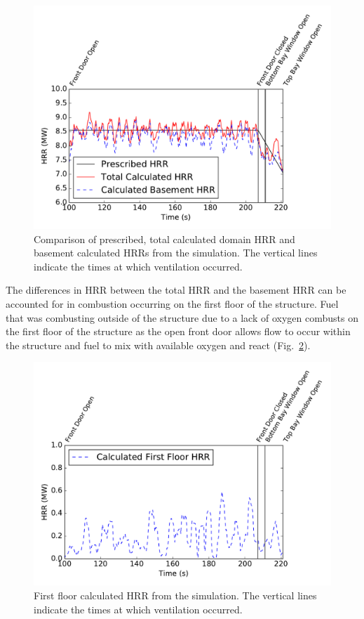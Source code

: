 \documentclass[12pt,oneside]{book}
\begin{document}
\begin{figure}[!ht]
\includegraphics[width=5in]{../Figures/PG_Basement_9MW_HRR}
\caption[Prescribed, calculated domain, and calculated basement HRRs vs. time from the simulation.]
{Comparison of prescribed, total calculated domain HRR and basement calculated HRRs from the simulation. The vertical lines indicate the times at which ventilation occurred.}
\label{fig:PG_Basement_9MW_HRR}
\end{figure}

The differences in HRR between the total HRR and the basement HRR can be accounted for in combustion occurring on the first floor of the structure. Fuel that was combusting outside of the structure due to a lack of oxygen combusts on the first floor of the structure as the open front door allows flow to occur within the structure and fuel to mix with available oxygen and react (Fig.~\ref{fig:PG_First_9MW_HRR}).

\begin{figure}[!ht]
\includegraphics[width=5in]{../Figures/PG_First_9MW_HRR}
\caption[First floor calculated HRR vs. time from the simulation.]
{First floor calculated HRR from the simulation. The vertical lines indicate the times at which ventilation occurred.}
\label{fig:PG_First_9MW_HRR}
\end{figure}
\end{document}
